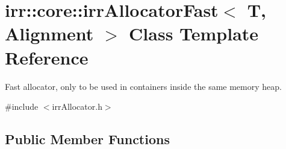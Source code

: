 \hypertarget{classirr_1_1core_1_1irrAllocatorFast}{}\section{irr\+:\+:core\+:\+:irr\+Allocator\+Fast$<$ T, Alignment $>$ Class Template Reference}
\label{classirr_1_1core_1_1irrAllocatorFast}


Fast allocator, only to be used in containers inside the same memory heap.  




{\ttfamily \#include $<$irr\+Allocator.\+h$>$}

\subsection*{Public Member Functions}
